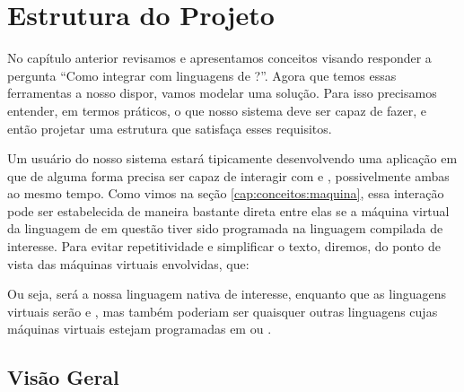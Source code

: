 \chapter{Estrutura do Projeto}
\label{cap:estrutura}

\setcounter{defcnt}{0}

  No capítulo anterior revisamos e apresentamos conceitos visando responder a
  pergunta ``Como integrar \CXX{} com linguagens de \script{}?''. Agora que
  temos essas ferramentas a nosso dispor, vamos modelar uma solução. Para isso
  precisamos entender, em termos práticos, o que nosso sistema deve ser capaz
  de fazer, e então projetar uma estrutura que satisfaça esses requisitos.
  
  Um usuário do nosso sistema estará tipicamente desenvolvendo uma aplicação
  em \CXX{} que de alguma forma precisa ser capaz de interagir com 
  e , possivelmente ambas ao mesmo tempo. Como vimos na seção
  \ref{cap:conceitos:maquina}, essa interação pode ser estabelecida de maneira
  bastante direta entre elas se a máquina virtual da linguagem de \script{} em
  questão tiver sido programada na linguagem compilada de interesse. Para evitar
  repetitividade e simplificar o texto, diremos, do ponto de vista das
  máquinas virtuais envolvidas, que:


  Ou seja, \CXX{} será a nossa linguagem nativa de interesse, enquanto que
  as linguagens virtuais serão  e , mas também poderiam
  ser quaisquer outras linguagens cujas máquinas virtuais estejam programadas em
  \C{} ou \CXX{}.

  \section{Visão Geral}
  \label{cap:estrutura:geral}

